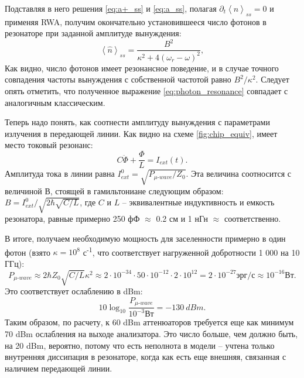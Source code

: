 \documentclass[12pt, twoside]{report}
\numberwithin{equation}{section}
\numberwithin{figure}{section}
\begin{document}
Подставляя в него решения \eqref{eq:a+_ss} и \eqref{eq:a_ss}, полагая $\partial_t \left< \hat n \right>_{ss} = 0$ и применяя RWA, получим окончательно установившееся число фотонов в резонаторе при заданной амплитуде вынуждения:
\begin{equation}
\left< \hat n \right>_{ss} = \frac{B^2}{\kappa^2 + 4(\omega_r - \omega)^2},
\label{eq:photon_resonance}
\end{equation} 
Как видно, число фотонов имеет резонансное поведение, и в случае точного совпадения частоты вынуждения с собственной частотой равно $B^2/\kappa^2$. Следует опять отметить, что полученное выражение \eqref{eq:photon_resonance} совпадает с аналогичным классическим\cite{thuneberg2013}.

Теперь надо понять, как соотнести амплитуду вынуждения с параметрами излучения в передающей линии. Как видно на схеме \autoref{fig:chip_equiv}, имеет место токовый резонанс:
$$
C\ddot{\Phi} + \frac{\Phi}{L} = I_{ext}(t).
$$
Амплитуда тока в линии  равна $I_{ext}^0 = \sqrt{P_{\mu\text{-}wave}/Z_0}$. Эта величина соотносится с величиной В, стоящей в гамильтониане следующим образом: $B = I_{ext}^0 / \sqrt{2\hbar \sqrt{C/L}}$, где $C$ и $L$ -- эквивалентные индуктивность и емкость резонатора, равные примерно 250 фФ $\approx$ 0.2 см и 1 нГн $\approx$ соответственно\cite{Jerger2013}. 

В итоге, получаем необходимую мощность для заселенности примерно в один фотон (взято $\kappa = 10^{8}$ с\textsuperscript{-1}, что соответствует нагруженной добротности 1 000 на 10 ГГц):
$$
P_{\mu\text{-}wave} \approx 2\hbar Z_0 \sqrt{C/L} \kappa^2 \approx 2 \cdot 10^{-34} \cdot 50 \cdot 10^{-12} \cdot 2 \cdot 10^{12} = 2\cdot10^{-27} \text{эрг/с}\approx 10^{-16} \text{Вт}.
$$
Это соответствует ослаблению в dBm:
$$10 \log_{10} \frac{P_{\mu\text{-}wave}}{10^{-3} \text{Вт}} = -130\ dBm.$$
Таким образом, по расчету, к 60 dBm аттенюаторов требуется еще как минимум 70 dBm ослабления на выходе анализатора. Это число больше, чем должно быть, на 20 dBm, вероятно, потому что есть неполнота в модели -- учтена только внутренняя диссипация в резонаторе, когда как есть еще внешняя, связанная с наличием передающей линии\cite{Jerger2013}. 
\end{document}
